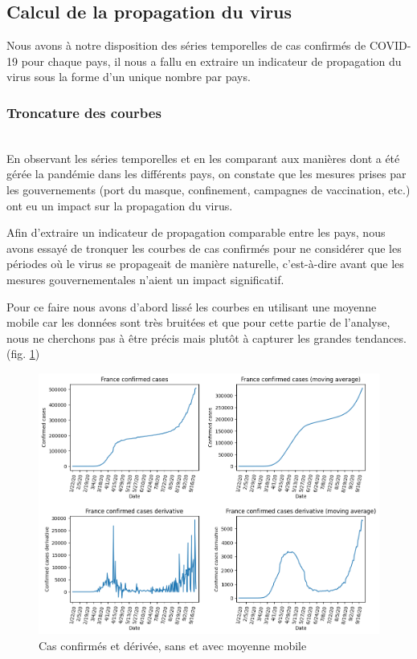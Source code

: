 \documentclass[12pt]{iEEEtran}
\begin{document}
\subsection{Calcul de la propagation du virus}

Nous avons à notre disposition des séries temporelles de cas confirmés de COVID-19 pour chaque
pays, il nous a fallu en extraire un indicateur de propagation du virus sous la forme d'un
unique nombre par pays.
\\

\subsubsection{Troncature des courbes}\hfill\\
En observant les séries temporelles et en les comparant aux manières dont a été gérée la pandémie
dans les différents pays, on constate que les mesures prises par les gouvernements (port du masque,
confinement, campagnes de vaccination, etc.) ont eu un impact sur la propagation du virus.

Afin d'extraire un indicateur de propagation comparable entre les pays, nous avons essayé de tronquer
les courbes de cas confirmés pour ne considérer que les périodes où le virus se propageait de manière
naturelle, c'est-à-dire avant que les mesures gouvernementales n'aient un impact significatif.

Pour ce faire nous avons d'abord lissé les courbes en utilisant une moyenne mobile car les données sont
très bruitées et que pour cette partie de l'analyse, nous ne cherchons pas à être précis mais plutôt à
capturer les grandes tendances. (fig. \ref{fig:moving_avg})

\begin{figure}[h]
    \centering
    \includegraphics[width=\columnwidth]{img/moving_avg.png}
    \caption{Cas confirmés et dérivée, sans et avec moyenne mobile}
    \label{fig:moving_avg}
\end{figure}
\end{document}
